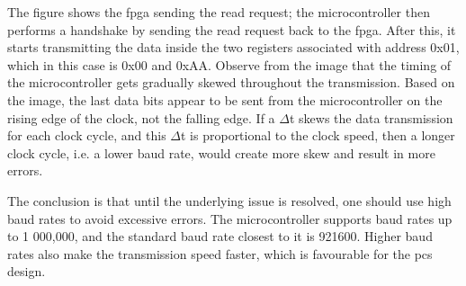 \documentclass[main.tex]{subfiles}
\begin{document}
The figure shows the \gls{fpga} sending the read request; the microcontroller then performs a handshake by sending the read request back to the \gls{fpga}. After this, it starts transmitting the data inside the two registers associated with address 0x01, which in this case is 0x00 and 0xAA. Observe from the image that the timing of the microcontroller gets gradually skewed throughout the transmission. Based on the image, the last data bits appear to be sent from the microcontroller on the rising edge of the clock, not the falling edge. If a $\Delta$t skews the data transmission for each clock cycle, and this $\Delta$t is proportional to the clock speed, then a longer clock cycle, i.e. a lower baud rate, would create more skew and result in more errors.

The conclusion is that until the underlying issue is resolved, one should use high baud rates to avoid excessive errors. The microcontroller supports baud rates up to 1 000,000, and the standard baud rate closest to it is 921600. Higher baud rates also make the transmission speed faster, which is favourable for the \gls{pcs} design.
\end{document}

